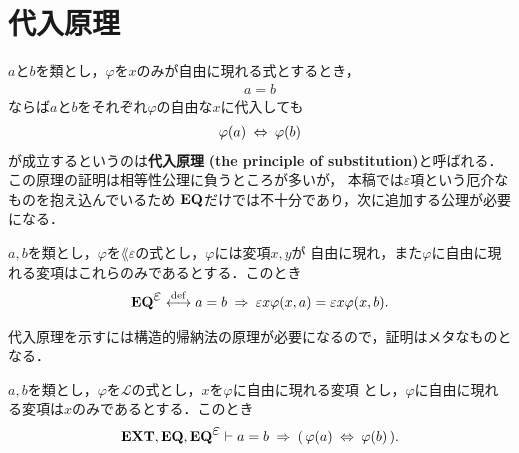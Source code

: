 \section{代入原理}
	$a$と$b$を類とし，$\varphi$を$x$のみが自由に現れる式とするとき，
	\begin{align}
		a = b
	\end{align}
	ならば$a$と$b$をそれぞれ$\varphi$の自由な$x$に代入しても
	\begin{align}
		\varphi(a) \hspace{0.25em}\Leftrightarrow\hspace{0.25em} \varphi(b)
	\end{align}
	が成立するというのは{\bf 代入原理}
	{\bf (the principle of substitution)}と呼ばれる．
	この原理の証明は相等性公理に負うところが多いが，
	本稿では$\varepsilon$項という厄介なものを抱え込んでいるため
	$\mbox{{\bf EQ}}$だけでは不十分であり，次に追加する公理が必要になる．
	
	\begin{screen}
		\begin{axm}
			$a,b$を類とし，$\varphi$を$\lang{\varepsilon}$の式とし，$\varphi$には変項$x,y$が
			自由に現れ，また$\varphi$に自由に現れる変項はこれらのみであるとする．このとき
			\begin{align}
				\EQAXEP \defarrow
				a = b \rarrow \varepsilon x \varphi(x,a) = \varepsilon x \varphi(x,b).
			\end{align}
		\end{axm}
	\end{screen}
	
	代入原理を示すには構造的帰納法の原理が必要になるので，証明はメタなものとなる．
	
	\begin{screen}
		\begin{thm}[代入原理]\label{thm:the_principle_of_substitution}
			$a,b$を類とし，$\varphi$を$\mathcal{L}$の式とし，$x$を$\varphi$に自由に現れる変項
			とし，$\varphi$に自由に現れる変項は$x$のみであるとする．このとき
			\begin{align}
				\EXTAX,\EQAX,\EQAXEP \vdash a = b \rarrow 
				(\, \varphi(a) \lrarrow \varphi(b)\, ).
			\end{align}
		\end{thm}
	\end{screen}
	

